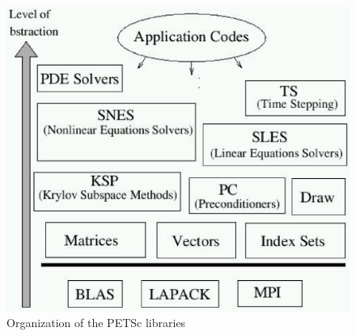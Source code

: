 \documentclass{article}
\begin{document}
\begin{figure}[htp!]
      \centering
      \includegraphics[width=.5\textwidth,height=.5\textwidth]{petsc-diagram_6.eps}
      \caption{Organization of the PETSc libraries}
      \label{petsc-diagram}
\end{figure}
\end{document}
